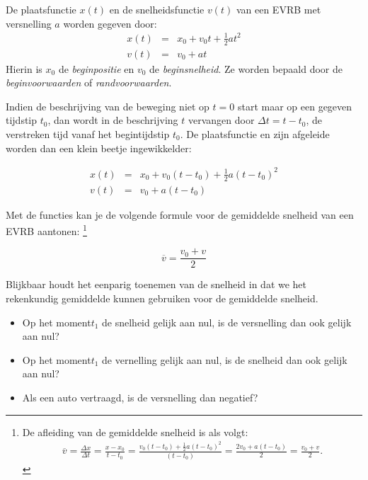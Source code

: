 \documentclass{ximera}
\begin{document}
\begin{theorem}
De plaatsfunctie $x(t)$ en de snelheidsfunctie $v(t)$ van een EVRB met versnelling $a$ worden gegeven door:
\[
\begin{array}{rcl}
x(t)&=&x_0+v_0t+\frac{1}{2}at^2\\
v(t)&=&v_0+at
\end{array}
\]
Hierin is $x_0$ de \textit{beginpositie} en $v_0$ de \textit{beginsnelheid}. Ze worden bepaald door de \textit{beginvoorwaarden} of \textit{randvoorwaarden}.
\end{theorem}	

Indien de beschrijving van de beweging niet op $t=0$ start maar op een gegeven tijdstip $t_0$, dan wordt in de beschrijving $t$ vervangen door $\Delta t= t-t_0$, de verstreken tijd vanaf het begintijdstip $t_0$. De plaatsfunctie en zijn afgeleide worden dan een klein beetje ingewikkelder:

\[
\begin{array}{rcl}
x(t)&=&x_0+v_0(t-t_0)+\frac{1}{2}a(t-t_0)^2\\
v(t)&=&v_0+a(t-t_0)
\end{array}
\]

Met de functies kan je de volgende formule voor de gemiddelde snelheid van een EVRB aantonen:%
\footnote{De afleiding van de gemiddelde snelheid is als volgt:
\begin{eqnarray*}
\overline{v}=\frac{\Delta x}{\Delta t}=\frac{x-x_0}{t-t_0}=\frac{v_0(t-t_0)+\frac{1}{2}a(t-t_0)^2}{(t-t_0)}=\frac{2v_0+a(t-t_0)}{2}=\frac{v_0+v}{2}.
\end{eqnarray*}}

\[
\overline{v}=\frac{v_0+v}{2}
\]

Blijkbaar houdt het eenparig toenemen van de snelheid in dat we het rekenkundig gemiddelde kunnen gebruiken voor de gemiddelde snelheid.



\begin{quickquestion*}{}{}
\begin{itemize}
	\item Op het moment\(t_1\) de snelheid gelijk aan nul, is de versnelling dan ook gelijk aan nul? 
	\item Op het moment\(t_1\) de vernelling gelijk aan nul, is de snelheid dan ook gelijk aan nul? 
	\item Als een auto vertraagd, is de versnelling dan negatief? 
\end{itemize}
\end{quickquestion*}
\end{document}
